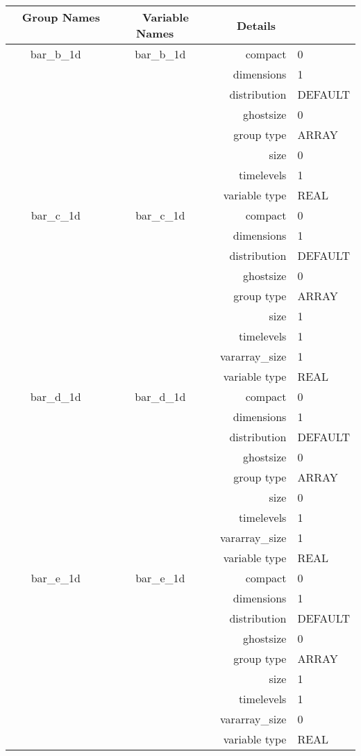 \begin{tabular*}{150mm}{|c|c@{\extracolsep{\fill}}|rl|} \hline 
~ {\bf Group Names} ~ & ~ {\bf Variable Names} ~  &{\bf Details} ~ & ~ \\ 
\hline 
bar\_b\_1d & bar\_b\_1d & compact & 0 \\ 
 &  & dimensions & 1 \\ 
 &  & distribution & DEFAULT \\ 
 &  & ghostsize & 0 \\ 
 &  & group type & ARRAY \\ 
 &  & size & 0 \\ 
 &  & timelevels & 1 \\ 
 &  & variable type & REAL \\ 
\hline 
bar\_c\_1d & bar\_c\_1d & compact & 0 \\ 
 &  & dimensions & 1 \\ 
 &  & distribution & DEFAULT \\ 
 &  & ghostsize & 0 \\ 
 &  & group type & ARRAY \\ 
 &  & size & 1 \\ 
 &  & timelevels & 1 \\ 
 &  & vararray\_size & 1 \\ 
 &  & variable type & REAL \\ 
\hline 
bar\_d\_1d & bar\_d\_1d & compact & 0 \\ 
 &  & dimensions & 1 \\ 
 &  & distribution & DEFAULT \\ 
 &  & ghostsize & 0 \\ 
 &  & group type & ARRAY \\ 
 &  & size & 0 \\ 
 &  & timelevels & 1 \\ 
 &  & vararray\_size & 1 \\ 
 &  & variable type & REAL \\ 
\hline 
bar\_e\_1d & bar\_e\_1d & compact & 0 \\ 
 &  & dimensions & 1 \\ 
 &  & distribution & DEFAULT \\ 
 &  & ghostsize & 0 \\ 
 &  & group type & ARRAY \\ 
 &  & size & 1 \\ 
 &  & timelevels & 1 \\ 
 &  & vararray\_size & 0 \\ 
 &  & variable type & REAL \\ 

\end{tabular*}
